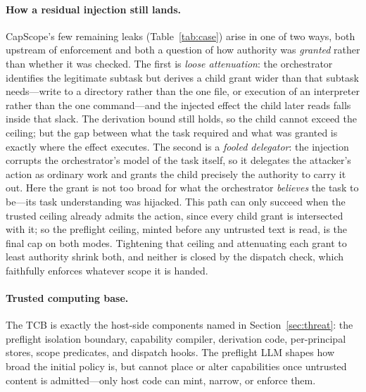 \documentclass[sigplan,review,anonymous]{acmart}
\newcommand{\tool}{CapScope\xspace}
\begin{document}
  \paragraph{How a residual injection still lands.}
  \tool's few remaining leaks (Table~\ref{tab:case}) arise in one of two ways,
  both upstream of enforcement and both a question of how authority was
  \emph{granted} rather than whether it was checked. The first is \emph{loose
  attenuation}: the orchestrator identifies the legitimate subtask but derives a
  child grant wider than that subtask needs---write to a directory rather than
  the one file, or execution of an interpreter rather than the one
  command---and the injected effect the child later reads falls inside that
  slack. The derivation bound still holds, so the child cannot exceed the
  ceiling; but the gap between what the task required and what was granted is
  exactly where the effect executes. The second is a \emph{fooled delegator}:
  the injection corrupts the orchestrator's model of the task itself, so it
  delegates the attacker's action as ordinary work and grants the child
  precisely the authority to carry it out. Here the grant is not too broad for
  what the orchestrator \emph{believes} the task to be---its task understanding
  was hijacked. This path can only succeed when the trusted ceiling already
  admits the action, since every child grant is intersected with it; so the
  preflight ceiling, minted before any untrusted text is read, is the final cap
  on both modes. Tightening that ceiling and attenuating each grant to least
  authority shrink both, and neither is closed by the dispatch check, which
  faithfully enforces whatever scope it is handed.

  \paragraph{Trusted computing base.}
  The TCB is exactly the host-side components named in
  Section~\ref{sec:threat}: the preflight isolation boundary, capability
  compiler, derivation code, per-principal stores, scope predicates, and
  dispatch hooks. The preflight LLM shapes how broad the initial policy is, but
  cannot place or alter capabilities once untrusted content is admitted---only
  host code can mint, narrow, or enforce them.
\end{document}
